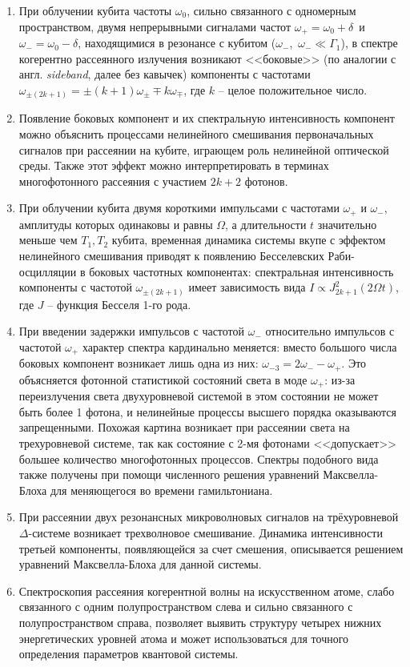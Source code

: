 {}
\begin{enumerate}
  \item При облучении кубита частоты $\omega_0$, сильно связанного с одномерным пространством, двумя непрерывными сигналами частот $\omega_+=\omega_0+\delta$~и~$\omega_-=\omega_0-\delta$, находящимися в резонансе с кубитом ($\omega_-$,~$\omega_-\ll\Gamma_1$), в спектре когерентно рассеянного излучения возникают <<боковые>> (по аналогии с англ. \textit{sideband}, далее без кавычек) компоненты с частотами $\omega_{\pm(2k+1)}=\pm(k+1)\omega_{\pm}\mp k\omega_{\mp}$, где $k$ -- целое положительное число.
  \item Появление боковых компонент и их спектральную интенсивность компонент можно объяснить процессами нелинейного смешивания первоначальных сигналов при рассеянии на кубите, играющем роль нелинейной оптической среды. Также этот эффект можно интерпретировать в терминах многофотонного рассеяния с участием $2k+2$ фотонов.
  \item При облучении кубита двумя короткими импульсами с частотами $\omega_+$ и $\omega_-$, амплитуды которых одинаковы и равны $\Omega$, а длительности $t$ значительно меньше чем $T_1,T_2$ кубита, временная динамика системы вкупе с эффектом нелинейного смешивания приводят к появлению Бесселевских Раби-осцилляции в боковых частотных компонентах: спектральная интенсивность компоненты с частотой $\omega_{\pm(2k+1)}$ имеет зависимость вида $I \propto J^2_{2k+1}(2\Omega t)$, где $J$ -- функция Бесселя 1-го рода. 
  \item При введении задержки импульсов с частотой $\omega_-$ относительно импульсов с частотой $\omega_+$  характер спектра кардинально меняется: вместо большого числа боковых компонент возникает лишь одна из них: $\omega_{-3} = 2\omega_- - \omega_+$. Это объясняется фотонной статистикой состояний света в моде $\omega_+$: из-за переизлучения света двухуровневой системой в этом состоянии не может быть более 1 фотона, и нелинейные процессы высшего порядка оказываются запрещенными. Похожая картина возникает при рассеянии света на трехуровневой системе, так как состояние с 2-мя фотонами <<допускает>> большее количество многофотонных процессов. Спектры подобного вида также получены при помощи численного решения уравнений Максвелла-Блоха для меняющегося во времени гамильтониана.
  \item При рассеянии двух резонансных микроволновых сигналов на трёхуровневой $\Delta$-системе возникает трехволновое смешивание. Динамика интенсивности третьей компоненты, появляющейся за счет смешения, описывается решением уравнений Максвелла-Блоха для данной системы. 
  \item Спектроскопия рассеяния когерентной волны на искусственном атоме, слабо связанного с одним полупространством слева и сильно связанного с полупространством справа, позволяет выявить структуру четырех нижних энергетических уровней атома и может использоваться для точного определения параметров квантовой системы. 
\end{enumerate}

